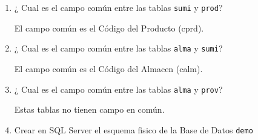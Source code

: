 \begin{enumerate}
\begin{enumerate}
\item ¿ Cual es el campo común entre las tablas \texttt{sumi} y \texttt{prod}?

El campo común es el Código del Producto (cprd). \\
\item ¿ Cual es el campo común entre las tablas \texttt{alma} y \texttt{sumi}?

El campo común es el Código del Almacen (calm). \\
\item ¿ Cual es el campo común entre las tablas \texttt{alma} y \texttt{prov}?

Estas tablas no tienen campo en común. \\
\item Crear en SQL Server el esquema fisico de la Base de Datos \texttt{demo}

\end{enumerate}
\end{enumerate}